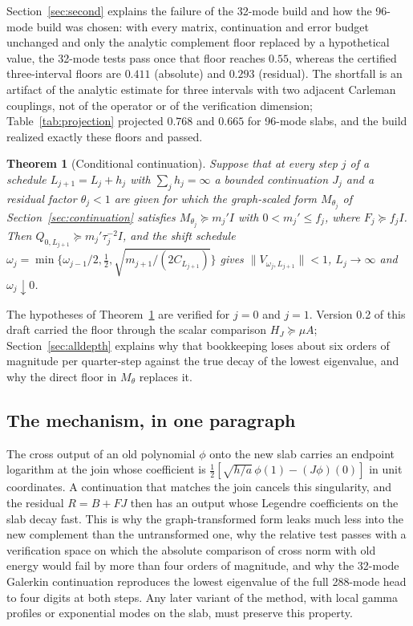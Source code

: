 \documentclass[11pt]{article}
\numberwithin{equation}{section}
\newtheorem{theorem}{Theorem}[section]
\theoremstyle{definition}
\theoremstyle{remark}
\newcommand{\norm}[1]{\lVert#1\rVert}
\begin{document}
Section~\ref{sec:second} explains the failure of the 32-mode build and how the 96-mode build was chosen: with every matrix, continuation and error budget unchanged and only the analytic complement floor replaced by a hypothetical value, the 32-mode tests pass once that floor reaches $0.55$, whereas the certified three-interval floors are $0.411$ (absolute) and $0.293$ (residual). The shortfall is an artifact of the analytic estimate for three intervals with two adjacent Carleman couplings, not of the operator or of the verification dimension; Table~\ref{tab:projection} projected $0.768$ and $0.665$ for 96-mode slabs, and the build realized exactly these floors and passed.

\begin{theorem}[Conditional continuation]\label{thm:conditional-intro}
Suppose that at every step $j$ of a schedule $L_{j+1}=L_j+h_j$ with $\sum_jh_j=\infty$ a bounded continuation $J_j$ and a residual factor $\theta_j<1$ are given for which the graph-scaled form $M_{\theta_j}$ of Section~\ref{sec:continuation} satisfies $M_{\theta_j}\succeq m_j'I$ with $0<m_j'\le f_j$, where $F_j\succeq f_jI$. Then $Q_{0,L_{j+1}}\succeq m_j'\tau_j^{-2}I$, and the shift schedule $\omega_j=\min\{\omega_{j-1}/2,\tfrac12,\sqrt{m_{j+1}/(2C_{L_{j+1}})}\}$ gives $\norm{V_{\omega_j,L_{j+1}}}<1$, $L_j\to\infty$ and $\omega_j\downarrow0$.
\end{theorem}

The hypotheses of Theorem~\ref{thm:conditional-intro} are verified for $j=0$ and $j=1$. Version 0.2 of this draft carried the floor through the scalar comparison $H_J\succeq\mu A$; Section~\ref{sec:alldepth} explains why that bookkeeping loses about six orders of magnitude per quarter-step against the true decay of the lowest eigenvalue, and why the direct floor in $M_\theta$ replaces it.

\subsection{The mechanism, in one paragraph}
The cross output of an old polynomial $\phi$ onto the new slab carries an endpoint logarithm at the join whose coefficient is $\tfrac12[\sqrt{h/a}\,\phi(1)-(J\phi)(0)]$ in unit coordinates. A continuation that matches the join cancels this singularity, and the residual $R=B+FJ$ then has an output whose Legendre coefficients on the slab decay fast. This is why the graph-transformed form leaks much less into the new complement than the untransformed one, why the relative test passes with a verification space on which the absolute comparison of cross norm with old energy would fail by more than four orders of magnitude, and why the 32-mode Galerkin continuation reproduces the lowest eigenvalue of the full 288-mode head to four digits at both steps. Any later variant of the method, with local gamma profiles or exponential modes on the slab, must preserve this property.
\end{document}
